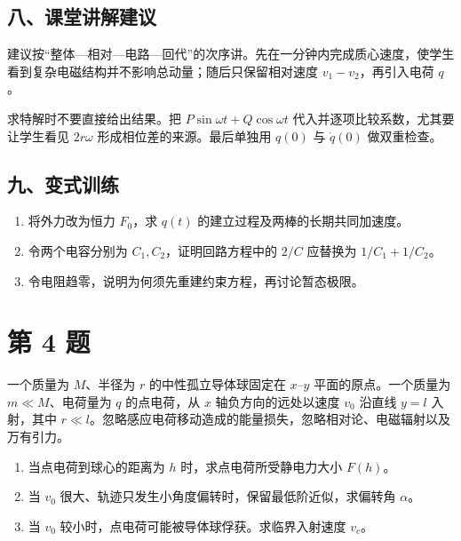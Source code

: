 \documentclass[12pt,a4paper,UTF8]{ctexart}
\newcommand{\tightlist}{\setlength{\itemsep}{0pt}\setlength{\parskip}{0pt}}
\begin{document}
\subsection{八、课堂讲解建议}\label{ux516bux8bfeux5802ux8bb2ux89e3ux5efaux8bae-2}

建议按``整体---相对---电路---回代''的次序讲。先在一分钟内完成质心速度，使学生看到复杂电磁结构并不影响总动量；随后只保留相对速度
\(v_1-v_2\)，再引入电荷 \(q\)。

求特解时不要直接给出结果。把 \(P\sin\omega t+Q\cos\omega t\)
代入并逐项比较系数，尤其要让学生看见 \(2r\omega\)
形成相位差的来源。最后单独用 \(q(0)\) 与 \(\dot q(0)\) 做双重检查。

\subsection{九、变式训练}\label{ux4e5dux53d8ux5f0fux8badux7ec3-2}

\begin{enumerate}
\def\labelenumi{\arabic{enumi}.}
\tightlist
\item
  将外力改为恒力 \(F_0\)，求 \(q(t)\) 的建立过程及两棒的长期共同加速度。
\item
  令两个电容分别为 \(C_1,C_2\)，证明回路方程中的 \(2/C\) 应替换为
  \(1/C_1+1/C_2\)。
\item
  令电阻趋零，说明为何须先重建约束方程，再讨论暂态极限。
\end{enumerate}

\newpage

\section{第 4 题}\label{ux7b2c-4-ux9898}

一个质量为 \(M\)、半径为 \(r\) 的中性孤立导体球固定在 \(x\)--\(y\)
平面的原点。一个质量为 \(m\ll M\)、电荷量为 \(q\) 的点电荷，从 \(x\)
轴负方向的远处以速度 \(v_0\) 沿直线 \(y=l\) 入射，其中
\(r\ll l\)。忽略感应电荷移动造成的能量损失，忽略相对论、电磁辐射以及万有引力。

\begin{enumerate}
\def\labelenumi{\arabic{enumi}.}
\tightlist
\item
  当点电荷到球心的距离为 \(h\) 时，求点电荷所受静电力大小 \(F(h)\)。
\item
  当 \(v_0\) 很大、轨迹只发生小角度偏转时，保留最低阶近似，求偏转角
  \(\alpha\)。
\item
  当 \(v_0\) 较小时，点电荷可能被导体球俘获。求临界入射速度 \(v_c\)。
\end{enumerate}
\end{document}
